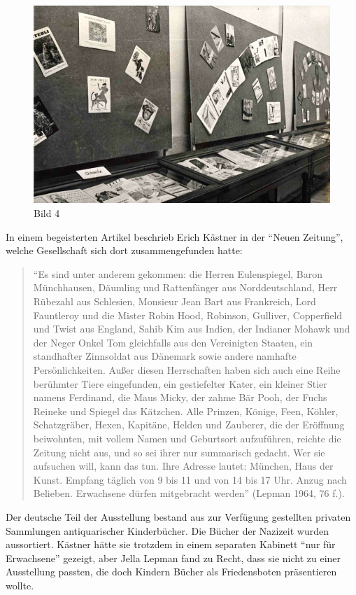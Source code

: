\documentclass[a4paper,
fontsize=11pt,
oneside,
numbers=noperiodatend,
parskip=half-,
bibliography=totoc,
final
]{scrartcl}
\begin{document}
\begin{figure}[htbp]
\centering
\includegraphics{img/Bild4.jpg}
\caption{Bild 4}
\end{figure}

In einem begeisterten Artikel beschrieb Erich Kästner in der
\enquote{Neuen Zeitung}, welche Gesellschaft sich dort zusammengefunden
hatte:

\begin{quote}
\enquote{Es sind unter anderem gekommen: die Herren Eulenspiegel, Baron
Münchhausen, Däumling und Rattenfänger aus Norddeutschland, Herr
Rübezahl aus Schlesien, Monsieur Jean Bart aus Frankreich, Lord
Fauntleroy und die Mister Robin Hood, Robinson, Gulliver, Copperfield
und Twist aus England, Sahib Kim aus Indien, der Indianer Mohawk und der
Neger Onkel Tom gleichfalls aus den Vereinigten Staaten, ein standhafter
Zinnsoldat aus Dänemark sowie andere namhafte Persönlichkeiten. Außer
diesen Herrschaften haben sich auch eine Reihe berühmter Tiere
eingefunden, ein gestiefelter Kater, ein kleiner Stier namens Ferdinand,
die Maus Micky, der zahme Bär Pooh, der Fuchs Reineke und Spiegel das
Kätzchen. Alle Prinzen, Könige, Feen, Köhler, Schatzgräber, Hexen,
Kapitäne, Helden und Zauberer, die der Eröffnung beiwohnten, mit vollem
Namen und Geburtsort aufzuführen, reichte die Zeitung nicht aus, und so
sei ihrer nur summarisch gedacht. Wer sie aufsuchen will, kann das tun.
Ihre Adresse lautet: München, Haus der Kunst. Empfang täglich von 9 bis
11 und von 14 bis 17 Uhr. Anzug nach Belieben. Erwachsene dürfen
mitgebracht werden} (Lepman 1964, 76 f.).
\end{quote}

Der deutsche Teil der Ausstellung bestand aus zur Verfügung gestellten
privaten Sammlungen antiquarischer Kinderbücher. Die Bücher der Nazizeit
wurden aussortiert. Kästner hätte sie trotzdem in einem separaten
Kabinett \enquote{nur für Erwachsene} gezeigt, aber Jella Lepman fand zu
Recht, dass sie nicht zu einer Ausstellung passten, die doch Kindern
Bücher als Friedensboten präsentieren wollte.
\end{document}

